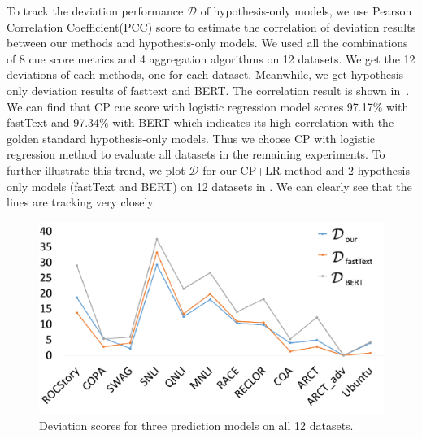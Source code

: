 To track the deviation performance $\mathcal{D}$ of hypothesis-only models,
we use Pearson Correlation Coefficient(PCC) score to estimate the correlation 
of deviation results between our methods and hypothesis-only models.  
We used all the combinations of 8 cue score metrics and 
4 aggregation algorithms on 12 datasets. We get the 12 deviations of each methods,
one for each dataset. 
Meanwhile, we get hypothesis-only deviation results of fasttext and BERT. 
The correlation result is shown in~. 
We can find that CP cue score with logistic regression model scores 97.17\% 
with fastText and 97.34\% with BERT which indicates its high correlation 
with the golden standard hypothesis-only models. 
Thus we choose CP with logistic regression method to evaluate all datasets in
the remaining experiments. 
To further illustrate this trend, we plot $\mathcal{D}$ for 
our CP+LR method and 2 hypothesis-only models (fastText and BERT) on 12 datasets
in . 
We can clearly see that the lines are tracking very closely.

\begin{figure}[th]
\centering
\includegraphics[width=1.0\columnwidth]{picture/d_figure.pdf}
\caption{Deviation scores for three prediction models on all 12 datasets.}
\label{fig:d_figure}
\end{figure}


